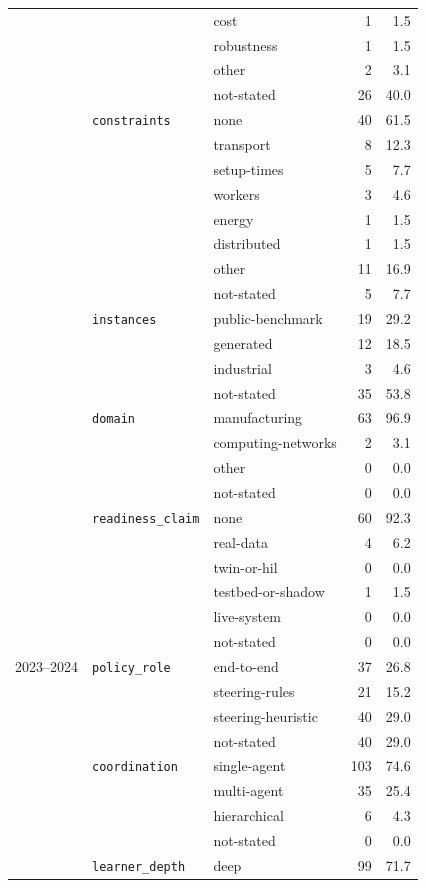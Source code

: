 \begin{longtable}{lllr@{\hspace{1.0em}}r}
 &  & cost & 1 & 1.5 \\
 &  & robustness & 1 & 1.5 \\
 &  & other & 2 & 3.1 \\
 &  & not-stated & 26 & 40.0 \\
 & \texttt{constraints} & none & 40 & 61.5 \\
 &  & transport & 8 & 12.3 \\
 &  & setup-times & 5 & 7.7 \\
 &  & workers & 3 & 4.6 \\
 &  & energy & 1 & 1.5 \\
 &  & distributed & 1 & 1.5 \\
 &  & other & 11 & 16.9 \\
 &  & not-stated & 5 & 7.7 \\
 & \texttt{instances} & public-benchmark & 19 & 29.2 \\
 &  & generated & 12 & 18.5 \\
 &  & industrial & 3 & 4.6 \\
 &  & not-stated & 35 & 53.8 \\
 & \texttt{domain} & manufacturing & 63 & 96.9 \\
 &  & computing-networks & 2 & 3.1 \\
 &  & other & 0 & 0.0 \\
 &  & not-stated & 0 & 0.0 \\
 & \texttt{readiness\_claim} & none & 60 & 92.3 \\
 &  & real-data & 4 & 6.2 \\
 &  & twin-or-hil & 0 & 0.0 \\
 &  & testbed-or-shadow & 1 & 1.5 \\
 &  & live-system & 0 & 0.0 \\
 &  & not-stated & 0 & 0.0 \\
2023--2024 & \texttt{policy\_role} & end-to-end & 37 & 26.8 \\
 &  & steering-rules & 21 & 15.2 \\
 &  & steering-heuristic & 40 & 29.0 \\
 &  & not-stated & 40 & 29.0 \\
 & \texttt{coordination} & single-agent & 103 & 74.6 \\
 &  & multi-agent & 35 & 25.4 \\
 &  & hierarchical & 6 & 4.3 \\
 &  & not-stated & 0 & 0.0 \\
 & \texttt{learner\_depth} & deep & 99 & 71.7 \\

\end{longtable}
